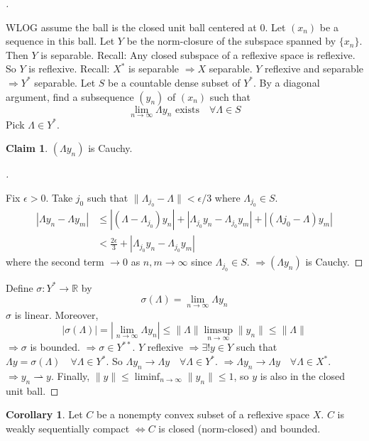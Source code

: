 \documentclass{article}
\theoremstyle{definition}
\newtheorem{cor}{Corollary}
\newtheorem*{clm}{Claim}
\newenvironment{proofs}[1][\proofname]{%
  \begin{proof}[#1]$ $\par\nobreak\ignorespaces
}{%
  \end{proof}
}
\newcommand{\RR}{\mathbb R}
\newcommand{\Ra}{\Rightarrow}
\newcommand{\Lra}{\Leftrightarrow}
\newcommand{\ru}{\rightharpoonup}
\begin{document}
\begin{proofs}
	WLOG assume the ball is the closed unit ball centered at 0.
	Let $(x_n)$ be a sequence in this ball.
	Let $Y$ be the norm-closure of the subspace spanned by $\{x_n\}$.
	Then $Y$ is separable.
	Recall: Any closed subspace of a reflexive space is reflexive.
	So $Y$ is reflexive.
	Recall: $X^*$ is separable $\Ra X$ separable.
	$Y$ reflexive and separable $\Ra Y^*$ separable.
	Let $S$ be a countable dense subset of $Y^*$.
	By a diagonal argument, find a subsequence $(y_n)$ of $(x_n)$ such that
	\[
		\lim_{n \to \infty} \Lambda y_n \text{ exists} \quad \forall \Lambda \in S
	\]
	Pick $\Lambda \in Y^*$.
	\begin{clm}
		$(\Lambda y_n)$ is Cauchy.
	\end{clm}
	\begin{proofs}
		Fix $\epsilon > 0$.
		Take $j_0$ such that $\|\Lambda_{j_0} - \Lambda\| < \epsilon/3$ where $\Lambda_{j_0} \in S$.
		\[
			\begin{split}
				|\Lambda y_n - \Lambda y_m| & \leq |(\Lambda - \Lambda_{j_0}) y_n| + |\Lambda_{j_0} y_n - \Lambda_{j_0} y_m| + |(\Lambda j_0 - \Lambda) y_m|\\
				&< \frac{2 \epsilon}{3} + |\Lambda_{j_0} y_n - \Lambda_{j_0} y_m|
			\end{split}
		\]
		where the second term $\to 0$ as $n, m \to \infty$ since $\Lambda_{j_0} \in S$.
		$\Ra (\Lambda y_n)$ is Cauchy.
	\end{proofs}
	Define $\sigma: Y^* \to \RR$ by
	\[
		\sigma(\Lambda) = \lim_{n \to \infty} \Lambda y_n
	\]
	$\sigma$ is linear.
	Moreover, 
	\[
		|\sigma(\Lambda)| = \left|\lim_{n \to \infty} \Lambda y_n\right| \leq \|\Lambda \| \limsup_{n \to \infty} \|y_n\| \leq \|\Lambda\|
	\]
	$\Ra \sigma$ is bounded.
	$\Ra \sigma \in Y^{**}$.
	$Y$ reflexive $\Ra \exists ! y \in Y$ such that $\Lambda y = \sigma(\Lambda) \quad \forall \Lambda \in Y^*$.
	So $\Lambda y_n \to \Lambda y \quad \forall \Lambda \in Y^*$.
	$\Ra \Lambda y_n \to \Lambda y \quad \forall \Lambda \in X^*$.
	$\Ra y_n \ru y$.
	Finally, $\|y\| \leq \liminf_{n \to \infty} \|y_n\| \leq 1$, so $y$ is also in the closed unit ball.
\end{proofs}

\begin{cor}
	Let $C$ be a nonempty convex subset of a reflexive space $X$.
	$C$ is weakly sequentially compact $\Lra C$ is closed (norm-closed) and bounded.
\end{cor}
\end{document}
